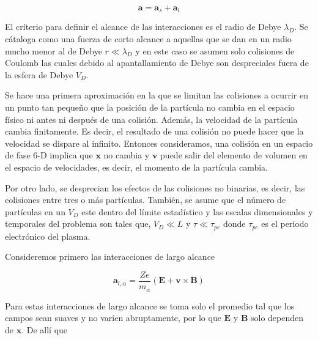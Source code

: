 \begin{equation*}
  \textbf{a} = \textbf{a}_s + \textbf{a}_l
\end{equation*}

El cr\'iterio para definir el alcance de las interacciones es el radio de Debye $\lambda_D$. Se c\'ataloga como una fuerza de corto alcance a aquellas que se dan en un radio mucho menor al de Debye $r \ll \lambda_D$ y en este caso se asumen solo colisiones de Coulomb las cuales debido al apantallamiento de Debye son despreciales fuera de la esfera de Debye $V_D$. 

Se hace una primera aproximaci\'on en la que se limitan las colisiones a ocurrir en un punto tan pequeño que la posici\'on de la part\'icula no cambia en el espacio f\'isico ni antes ni despu\'es de una colisi\'on. Adem\'as, la velocidad de la part\'icula cambia finitamente. Es decir, el resultado de una colisi\'on no puede hacer que la velocidad se dispare al infinito. Entonces consideramos, una colisi\'on en un espacio de fase 6-D implica que $\textbf{x}$ no cambia y $\textbf{v}$ puede salir del elemento de volumen en el espacio de velocidades, es decir, el momento de la part\'icula cambia. 

Por otro lado, se desprecian los efectos de las colisiones no binarias, es decir, las colisiones entre tres o m\'as part\'iculas. Tambi\'en, se asume que el n\'umero de part\'iculas en un $V_D$ este dentro del l\'imite estad\'istico y las escalas dimensionales y temporales del problema son tales que, $V_D \ll L$ y $\tau \ll \tau_{pe}$ donde $\tau_{pe}$ es el periodo electr\'onico del plasma. 

Consideremos primero las interacciones de largo alcance

\begin{equation*}
  \textbf{a}_{l,\alpha} = \frac{Ze}{m_\alpha}(\textbf{E} + \textbf{v}\times\textbf{B})
\end{equation*}

Para estas interacciones de largo alcance se toma solo el promedio tal que los campos sean suaves y no var\'ien abruptamente, por lo que $\textbf{E}$ y $\textbf{B}$ solo dependen de $\textbf{x}$. De all\'i que

